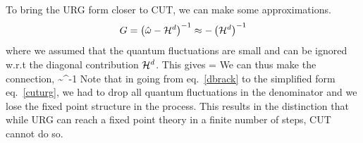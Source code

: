\documentclass[12pt,twoside]{article}
\numberwithin{equation}{section}
\begin{document}
\pb To bring the URG form closer to CUT, we can make some approximations. 
\begin{equation}
G = \left(\hat \omega - \mathcal{H}^d\right)^{-1} \approx -\left(\mathcal{H}^d\right)^{-1}
\end{equation}
where we assumed that the quantum fluctuations are small and can be ignored w.r.t the diagonal contribution \(\mathcal{H}^d\). This gives
\beq[cuturg]
 =  
\eeq
We can thus make the connection,
\beq
\Delta \lambda \sim {}^{-1}
\eeq
Note that in going from eq.~\ref{dbrack} to the simplified form eq.~\ref{cuturg}, we had to drop all quantum fluctuations in the denominator and we lose the fixed point structure in the process. This results in the distinction that while URG can reach a fixed point theory in a finite number of steps, CUT cannot do so.
\end{document}
